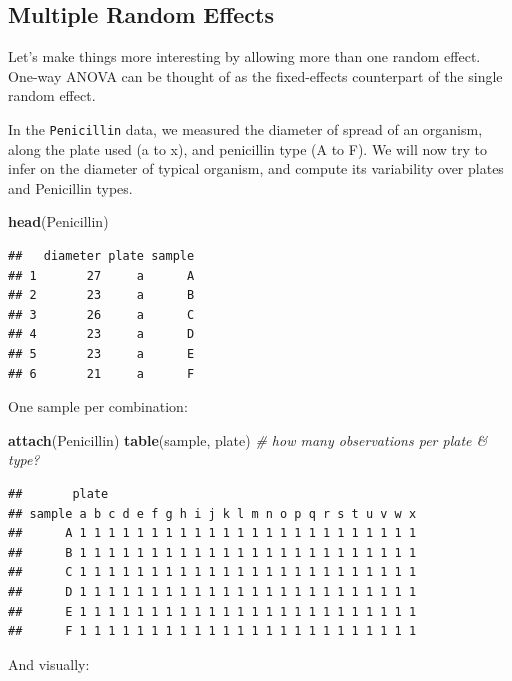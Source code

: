 \documentclass[]{book}
\newenvironment{Shaded}{\begin{snugshade}}{\end{snugshade}}
\newcommand{\CommentTok}[1]{\textcolor[rgb]{0.56,0.35,0.01}{\textit{#1}}}
\newcommand{\KeywordTok}[1]{\textcolor[rgb]{0.13,0.29,0.53}{\textbf{#1}}}
\newcommand{\NormalTok}[1]{#1}
\theoremstyle{definition}
\theoremstyle{definition}
\theoremstyle{definition}
\theoremstyle{remark}
\begin{document}
\hypertarget{multiple-random-effects}{%
\subsection{Multiple Random Effects}\label{multiple-random-effects}}

Let's make things more interesting by allowing more than one random effect.
One-way ANOVA can be thought of as the fixed-effects counterpart of the single random effect.

In the \texttt{Penicillin} data, we measured the diameter of spread of an organism, along the plate used (a to x), and penicillin type (A to F).
We will now try to infer on the diameter of typical organism, and compute its variability over plates and Penicillin types.

\begin{Shaded}
\begin{Highlighting}[]
\KeywordTok{head}\NormalTok{(Penicillin)}
\end{Highlighting}
\end{Shaded}

\begin{verbatim}
##   diameter plate sample
## 1       27     a      A
## 2       23     a      B
## 3       26     a      C
## 4       23     a      D
## 5       23     a      E
## 6       21     a      F
\end{verbatim}

One sample per combination:

\begin{Shaded}
\begin{Highlighting}[]
\KeywordTok{attach}\NormalTok{(Penicillin)}
\KeywordTok{table}\NormalTok{(sample, plate) }\CommentTok{# how many observations per plate & type?}
\end{Highlighting}
\end{Shaded}

\begin{verbatim}
##       plate
## sample a b c d e f g h i j k l m n o p q r s t u v w x
##      A 1 1 1 1 1 1 1 1 1 1 1 1 1 1 1 1 1 1 1 1 1 1 1 1
##      B 1 1 1 1 1 1 1 1 1 1 1 1 1 1 1 1 1 1 1 1 1 1 1 1
##      C 1 1 1 1 1 1 1 1 1 1 1 1 1 1 1 1 1 1 1 1 1 1 1 1
##      D 1 1 1 1 1 1 1 1 1 1 1 1 1 1 1 1 1 1 1 1 1 1 1 1
##      E 1 1 1 1 1 1 1 1 1 1 1 1 1 1 1 1 1 1 1 1 1 1 1 1
##      F 1 1 1 1 1 1 1 1 1 1 1 1 1 1 1 1 1 1 1 1 1 1 1 1
\end{verbatim}

And visually:
\end{document}
